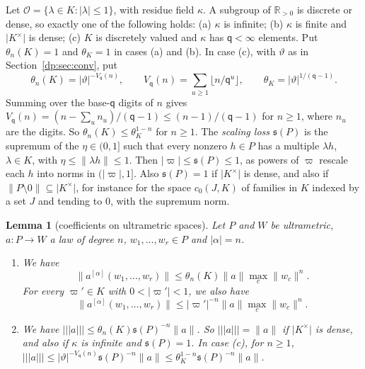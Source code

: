 \documentclass[11pt]{amsart}
\newtheorem{lemma}[theorem]{Lemma}
\theoremstyle{definition}
\theoremstyle{remark}
\numberwithin{equation}{section}
\newcommand{\abs}[1]{\lvert #1\rvert}
\newcommand{\norm}[1]{\lVert #1\rVert}
\theoremstyle{plain}
\theoremstyle{definition}
\theoremstyle{plain}
\begin{document}
Let $\mathcal O=\{\lambda\in K:\abs\lambda\le1\}$, with residue field $\kappa$. A subgroup of $\mathbb R_{>0}$ is discrete or dense, so exactly one of the following holds: (a) $\kappa$ is infinite; (b) $\kappa$ is finite and $\abs{K^\times}$ is dense; (c) $K$ is discretely valued and $\kappa$ has $\mathsf q<\infty$ elements. Put $\theta_n(K)=1$ and $\theta_K=1$ in cases (a) and (b). In case (c), with $\vartheta$ as in Section~\ref{dp:sec:conv}, put
\[
 \theta_n(K)=\abs\vartheta^{-V_{\mathsf q}(n)},\qquad V_{\mathsf q}(n)=\sum_{u\ge1}\lfloor n/\mathsf q^u\rfloor,\qquad\theta_K=\abs\vartheta^{1/(\mathsf q-1)}.
\]
Summing over the base-$\mathsf q$ digits of $n$ gives $V_{\mathsf q}(n)=(n-\sum_un_u)/(\mathsf q-1)\le(n-1)/(\mathsf q-1)$ for $n\ge1$, where $n_u$ are the digits. So $\theta_n(K)\le\theta_K^{1-n}$ for $n\ge1$. The \emph{scaling loss} $\mathfrak s(P)$ is the supremum of the $\eta\in(0,1]$ such that every nonzero $h\in P$ has a multiple $\lambda h$, $\lambda\in K$, with $\eta\le\norm{\lambda h}\le1$. Then $\abs\varpi\le\mathfrak s(P)\le1$, as powers of $\varpi$ rescale each $h$ into norms in $(\abs\varpi,1]$. Also $\mathfrak s(P)=1$ if $\abs{K^\times}$ is dense, and also if $\norm{P\setminus0}\subseteq\abs{K^\times}$, for instance for the space $c_0(J,K)$ of families in $K$ indexed by a set $J$ and tending to $0$, with the supremum norm.

\begin{lemma}[coefficients on ultrametric spaces]\label{dp:lem:strong-coefficients}
Let $P$ and $W$ be ultrametric, $a\colon P\to W$ a law of degree $n$, $w_1,\dots,w_r\in P$ and $\abs\alpha=n$.
\begin{enumerate}
\item We have
\[
 \norm{a^{[\alpha]}(w_1,\dots,w_r)}\le\theta_n(K)\norm a\max_c\norm{w_c}^n.
\]
For every $\varpi'\in K$ with $0<\abs{\varpi'}<1$, we also have
\[
 \norm{a^{[\alpha]}(w_1,\dots,w_r)}\le\abs{\varpi'}^{-n}\norm a\max_c\norm{w_c}^n.
\]
\item We have $\lvert\!\lvert\!\lvert a\rvert\!\rvert\!\rvert\le\theta_n(K)\mathfrak s(P)^{-n}\norm a$. So $\lvert\!\lvert\!\lvert a\rvert\!\rvert\!\rvert=\norm a$ if $\abs{K^\times}$ is dense, and also if $\kappa$ is infinite and $\mathfrak s(P)=1$. In case (c), for $n\ge1$, $\lvert\!\lvert\!\lvert a\rvert\!\rvert\!\rvert\le\abs\vartheta^{-V_{\mathsf q}(n)}\mathfrak s(P)^{-n}\norm a\le\theta_K^{1-n}\mathfrak s(P)^{-n}\norm a$.
\end{enumerate}
\end{lemma}
\end{document}
